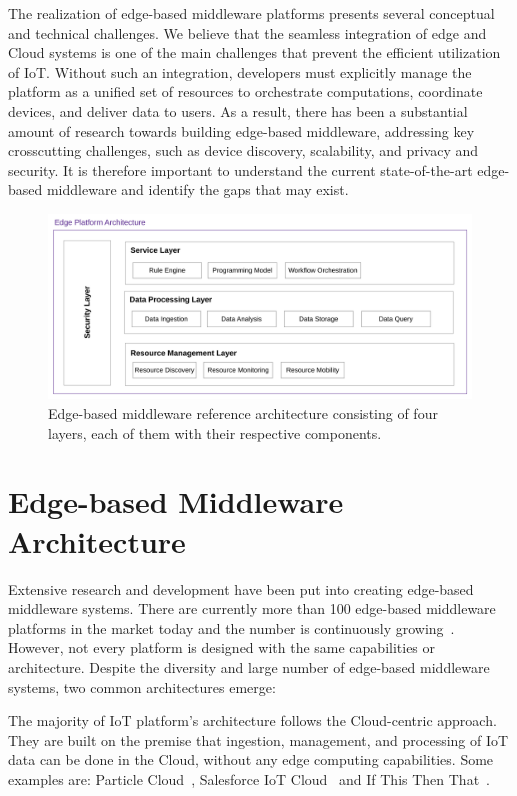 The realization of edge-based middleware platforms presents several conceptual and technical challenges. We believe that the seamless integration of edge and Cloud systems is one of the main challenges that prevent the efficient utilization of IoT. Without such an integration, developers must explicitly manage the platform as a unified set of resources to orchestrate computations, coordinate devices, and deliver data to users. As a result, there has been a substantial amount of research towards building edge-based middleware, addressing key crosscutting challenges, such as device discovery, scalability, and privacy and security. It is therefore important to understand the current state-of-the-art edge-based middleware and identify the gaps that may exist.

\begin{figure}[hbt!]
    \centering
    \includegraphics[scale=0.7]{Figures/IoTArchW.pdf}
    \caption{Edge-based middleware reference architecture consisting of four layers, each of them with their respective components.}
    \label{fig:EdgeArch}
\end{figure}

\section{Edge-based Middleware Architecture}\label{sec:arch}

Extensive research and development have been put into creating edge-based middleware systems. There are currently more than 100 edge-based middleware platforms in the market today and the number is continuously growing~\cite{List}. However, not every platform is designed with the same capabilities or architecture. Despite the diversity and large number of edge-based middleware systems, two common architectures emerge:

The majority of IoT platform's architecture follows the Cloud-centric approach. They are built on the premise that ingestion, management, and processing of IoT data can be done in the Cloud, without any edge computing capabilities. Some examples are: Particle Cloud~\cite{Particle}, Salesforce IoT Cloud~\cite{Salesforce_IoT_Cloud} and If This Then That~\cite{IFTTT}.

